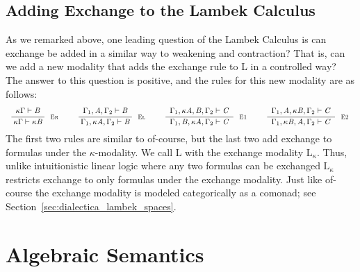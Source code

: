 \documentclass{lmcs}
\newcommand{\LE}{\text{L}_\kappa}
\begin{document}
\subsection{Adding Exchange to the Lambek Calculus}
\label{subsec:the_lambek_calculus_with_the_exchange_modality}
As we remarked above, one leading question of the Lambek Calculus is
can exchange be added in a similar way to weakening and contraction?
That is, can we add a new modality that adds the exchange rule to L in
a controlled way?  The answer to this question is positive, and the
rules for this new modality are as follows:
\[
\small
\begin{array}{ccccccccccccccccccccc}  
  \LdruleEr{} & & \LdruleEl{} & & \LdruleEOne{} & & \LdruleETwo{} 
\end{array}
\]
The first two rules are similar to of-course, but the last two add
exchange to formulas under the $\kappa$-modality.  We call L with the
exchange modality $\LE$.  Thus, unlike intuitionistic linear logic
where any two formulas can be exchanged $\LE$ restricts exchange to
only formulas under the exchange modality.  Just like of-course
the exchange modality is modeled categorically as a comonad; see
Section~\ref{sec:dialectica_lambek_spaces}.

\section{Algebraic Semantics}
\end{document}
